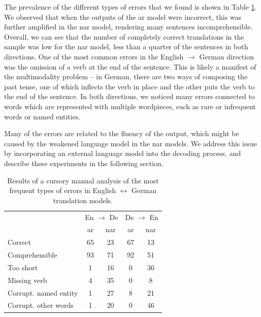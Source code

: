 The prevalence of the different types of errors that we found is shown in Table
\ref{tab:end-to-end:error-analysis}. We observed that when the outputs of the
\ac{ar} model were incorrect, this was further amplified in the \ac{nar} model,
rendering many sentences incomprehensible. Overall, we can see that the number
of completely correct translations in the sample was low for the \ac{nar}
model, less than a quarter of the sentences in both directions. One of the most
common errors in the English $\rightarrow$ German direction was the omission of
a verb at the end of the sentence. This is likely a manifest of the
multimodality problem -- in German, there are two ways of composing the past
tense, one of which inflects the verb in place and the other puts the verb to
the end of the sentence. In both directions, we noticed many errors connected
to words which are represented with multiple wordpieces, such as rare or
infrequent words or named entities.

Many of the errors are related to the fluency of the output, which might be
caused by the weakened language model in the \ac{nar} models. We address this
issue by incorporating an external language model into the decoding process,
and describe these experiments in the following section.

\begin{table}
  \centering
  \begin{tabular}{lcccc}
    \toprule
    & \multicolumn{2}{c}{En $\rightarrow$ De} & \multicolumn{2}{c}{De $\rightarrow$ En} \\
    & \acs{ar} & \acs{nar} & \acs{ar} & \acs{nar} \\
    \midrule
    Correct        & 65 & 23 & 67 & 13 \\
    Comprehensible & 93 & 71 & 92 & 51 \\
    \midrule
    Too short      & 1 & 16 & 0 & 36 \\
    Missing verb   & 4 & 35 & 0 & 8 \\
    Corrupt. named entity   & 1 & 27 & 8 & 21 \\
    Corrupt. other words & 1 & 20 & 0 & 46 \\
    \bottomrule
  \end{tabular}

  \caption{Results of a cursory manual analysis of the most frequent types of
    errors in English $\leftrightarrow$ German translation models.}%
  \label{tab:end-to-end:error-analysis}
\end{table}

